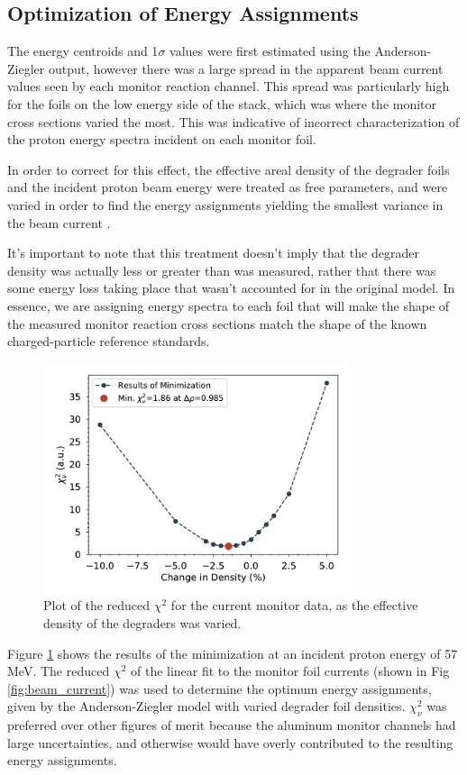 \documentclass[aps,superscriptaddress,twocolumn,secnumarabic,balancelastpage,amsmath,amssymb,nofootinbib,floatfix]{revtex4-1}
\begin{document}
\subsection{Optimization of Energy Assignments}

The energy centroids and 1$\sigma$ values were first estimated using the Anderson-Ziegler output, however there was a large spread in the apparent beam current values seen by each monitor reaction channel.  This spread was particularly high for the foils on the low energy side of the stack, which was where the monitor cross sections varied the most.  This was indicative of incorrect characterization of the proton energy spectra incident on each monitor foil.

In order to correct for this effect, the effective areal density of the degrader foils and the incident proton beam energy were treated as free parameters, and were varied in order to find the energy assignments yielding the smallest variance in the beam current \cite{GRAVES201644}.

It's important to note that this treatment doesn't imply that the degrader density was actually less or greater than was measured, rather that there was some energy loss taking place that wasn't accounted for in the original model.  In essence, we are assigning energy spectra to each foil that will make the shape of the measured monitor reaction cross sections match the shape of the known charged-particle reference standards.

\begin{figure}[htb]
\includegraphics[width=9cm]{monitors/minimize_az}
\caption{Plot of the reduced $\chi^2$ for the current monitor data, as the effective density of the degraders was varied.
}
\label{fig:minimization}
\end{figure}

Figure \ref{fig:minimization} shows the results of the minimization at an incident proton energy of 57 MeV.  The reduced $\chi^2$ of the linear fit to the monitor foil currents (shown in Fig \ref{fig:beam_current}) was used to determine the optimum energy assignments, given by the Anderson-Ziegler model with varied degrader foil densities.  $\chi^2_{\nu}$ was preferred over other figures of merit because the aluminum monitor channels had large uncertainties, and otherwise would have overly contributed to the resulting energy assignments.
\end{document}
